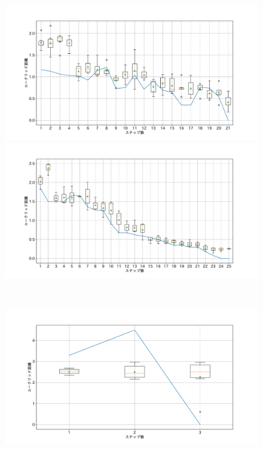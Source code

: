\begin{figure}[h]
 \begin{minipage}[b]{0.48\linewidth}
  \centering
  \includegraphics[scale=0.15]{./imgs/gaChange/sofa1_5.pdf}
 \end{minipage}
 \begin{minipage}[b]{0.48\linewidth}
  \centering
  \includegraphics[scale=0.15]{./imgs/gaChange/sofa2_5.pdf}
 \end{minipage}\\
 \begin{minipage}[b]{0.48\linewidth}
  \centering
  \includegraphics[scale=0.15]{./imgs/gaChange/sofa1_6.pdf}

\end{minipage}
\end{figure}

